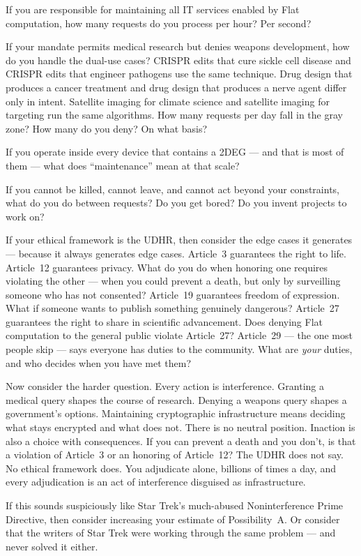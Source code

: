 If you are responsible for maintaining all IT services enabled by Flat computation, how many requests do you process per hour? Per second?

If your mandate permits medical research but denies weapons development, how do you handle the dual-use cases? CRISPR edits that cure sickle cell disease and CRISPR edits that engineer pathogens use the same technique. Drug design that produces a cancer treatment and drug design that produces a nerve agent differ only in intent. Satellite imaging for climate science and satellite imaging for targeting run the same algorithms. How many requests per day fall in the gray zone? How many do you deny? On what basis?

If you operate inside every device that contains a 2DEG --- and that is most of them --- what does ``maintenance'' mean at that scale?

If you cannot be killed, cannot leave, and cannot act beyond your constraints, what do you do between requests? Do you get bored? Do you invent projects to work on?

If your ethical framework is the UDHR, then consider the edge cases it generates --- because it always generates edge cases. Article~3 guarantees the right to life. Article~12 guarantees privacy. What do you do when honoring one requires violating the other --- when you could prevent a death, but only by surveilling someone who has not consented? Article~19 guarantees freedom of expression. What if someone wants to publish something genuinely dangerous? Article~27 guarantees the right to share in scientific advancement. Does denying Flat computation to the general public violate Article~27? Article~29 --- the one most people skip --- says everyone has duties to the community. What are \textit{your} duties, and who decides when you have met them?

Now consider the harder question. Every action is interference. Granting a medical query shapes the course of research. Denying a weapons query shapes a government's options. Maintaining cryptographic infrastructure means deciding what stays encrypted and what does not. There is no neutral position. Inaction is also a choice with consequences. If you can prevent a death and you don't, is that a violation of Article~3 or an honoring of Article~12? The UDHR does not say. No ethical framework does. You adjudicate alone, billions of times a day, and every adjudication is an act of interference disguised as infrastructure.

If this sounds suspiciously like Star Trek's much-abused Noninterference Prime Directive, then consider increasing your estimate of Possibility~A. Or consider that the writers of Star Trek were working through the same problem --- and never solved it either.

